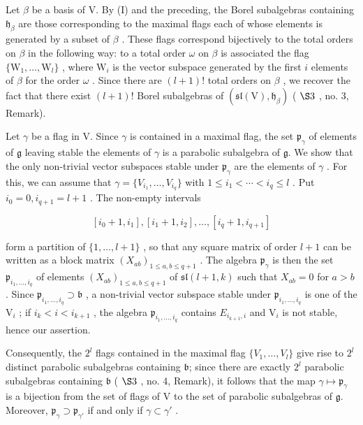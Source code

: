 Let \(\beta\) be a basis of V. By (I) and the preceding, the Borel subalgebras containing \(\mathfrak{h}_{\beta}\) are those corresponding to the maximal flags each of whose elements is generated by a subset of \(\beta\) . These flags correspond bijectively to the total orders on \(\beta\) in the following way: to a total order \(\omega\) on \(\beta\) is associated the flag \(\{\mathrm{W}_1,\dots ,\mathrm{W}_l\}\) , where \(\mathrm{W}_i\) is the vector subspace generated by the first \(i\) elements of \(\beta\) for the order \(\omega\) . Since there are \((l + 1)!\) total orders on \(\beta\) , we recover the fact that there exist \((l + 1)!\) Borel subalgebras of \((\mathfrak{sl}(\mathrm{V}),\mathfrak{h}_{\beta})\) ( \(\S 3\) , no. 3, Remark).

Let \(\gamma\) be a flag in V. Since \(\gamma\) is contained in a maximal flag, the set \(\mathfrak{p}_{\gamma}\) of elements of \(\mathfrak{g}\) leaving stable the elements of \(\gamma\) is a parabolic subalgebra of \(\mathfrak{g}\). We show that the only non-trivial vector subspaces stable under \(\mathfrak{p}_{\gamma}\) are the elements of \(\gamma\) . For this, we can assume that \(\gamma = \{V_{i_1}, \ldots, V_{i_q}\}\) with \(1 \leq i_1 < \cdots < i_q \leq l\) . Put \(i_0 = 0, i_{q+1} = l + 1\) . The non-empty intervals

\[
\left[ i _ {0} + 1, i _ {1} \right], \left[ i _ {1} + 1, i _ {2} \right], \dots , \left[ i _ {q} + 1, i _ {q + 1} \right]
\]

form a partition of \(\{1, \ldots, l + 1\}\) , so that any square matrix of order \(l + 1\) can be written as a block matrix \((X_{ab})_{1 \leq a, b \leq q + 1}\) . The algebra \(\mathfrak{p}_{\gamma}\) is then the set \(\mathfrak{p}_{i_1,\dots,i_q}\) of elements \((X_{ab})_{1\leq a,b\leq q + 1}\) of \(\mathfrak{sl}(l + 1,k)\) such that \(X_{ab} = 0\) for \(a > b\) . Since \(\mathfrak{p}_{i_1,\dots,i_q}\supset \mathfrak{b}\) , a non-trivial vector subspace stable under \(\mathfrak{p}_{i_1,\dots,i_q}\) is one of the \(\mathrm{V}_i\) ; if \(i_k < i < i_{k + 1}\) , the algebra \(\mathfrak{p}_{i_1,\dots,i_q}\) contains \(E_{i_{k + 1},i}\) and \(\mathrm{V}_i\) is not stable, hence our assertion.

Consequently, the \(2^{l}\) flags contained in the maximal flag \(\{V_{1},\ldots,V_{l}\}\) give rise to \(2^{l}\) distinct parabolic subalgebras containing \(\mathfrak{b}\); since there are exactly \(2^{l}\) parabolic subalgebras containing \(\mathfrak{b}\) ( \(\S3\) , no. 4, Remark), it follows that the map \(\gamma\mapsto \mathfrak{p}_{\gamma}\) is a bijection from the set of flags of V to the set of parabolic subalgebras of \(\mathfrak{g}\). Moreover, \(\mathfrak{p}_{\gamma}\supset \mathfrak{p}_{\gamma'}\) if and only if \(\gamma\subset\gamma'\) .

